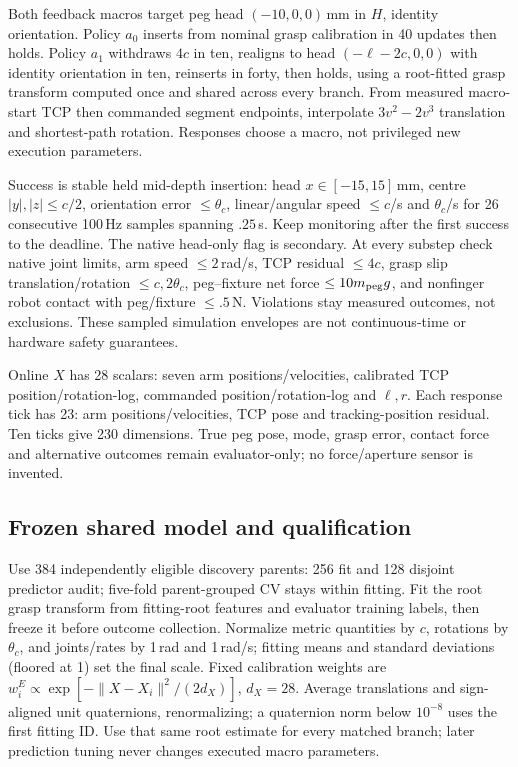 Both feedback macros target peg head $(-10, 0, 0)$\,mm in $H$, identity orientation. Policy $a_0$ inserts from nominal grasp calibration in 40 updates then holds. Policy $a_1$ withdraws $4c$ in ten, realigns to head $(-\ell-2c,0,0)$ with identity orientation in ten, reinserts in forty, then holds, using a root-fitted grasp transform computed once and shared across every branch. From measured macro-start TCP then commanded segment endpoints, interpolate $3v^2-2v^3$ translation and shortest-path rotation. Responses choose a macro, not privileged new execution parameters.

Success is stable held mid-depth insertion: head $x\in[-15, 15]$\,mm, centre $|y|,|z|\le c/2$, orientation error $\le\theta_c$, linear/angular speed $\le c$/s and $\theta_c$/s for 26 consecutive 100\,Hz samples spanning $.25$\,s. Keep monitoring after the first success to the deadline. The native head-only flag is secondary. At every substep check native joint limits, arm speed $\le2$\,rad/s, TCP residual $\le4c$, grasp slip translation/rotation $\le c, 2\theta_c$, peg--fixture net force $\le10m_{\rm peg}g$, and nonfinger robot contact with peg/fixture $\le.5$\,N. Violations stay measured outcomes, not exclusions. These sampled simulation envelopes are not continuous-time or hardware safety guarantees.

Online $X$ has 28 scalars: seven arm positions/velocities, calibrated TCP position/rotation-log, commanded position/rotation-log and $\ell,r$. Each response tick has 23: arm positions/velocities, TCP pose and tracking-position residual. Ten ticks give 230 dimensions. True peg pose, mode, grasp error, contact force and alternative outcomes remain evaluator-only; no force/aperture sensor is invented.

\subsection{Frozen shared model and qualification}
Use 384 independently eligible discovery parents: 256 fit and 128 disjoint predictor audit; five-fold parent-grouped CV stays within fitting. Fit the root grasp transform from fitting-root features and evaluator training labels, then freeze it before outcome collection. Normalize metric quantities by $c$, rotations by $\theta_c$, and joints/rates by 1\,rad and 1\,rad/s; fitting means and standard deviations (floored at 1) set the final scale. Fixed calibration weights are $w_i^E\propto\exp[-\|X-X_i\|^2/(2d_X)]$, $d_X=28$. Average translations and sign-aligned unit quaternions, renormalizing; a quaternion norm below $10^{-8}$ uses the first fitting ID. Use that same root estimate for every matched branch; later prediction tuning never changes executed macro parameters.

